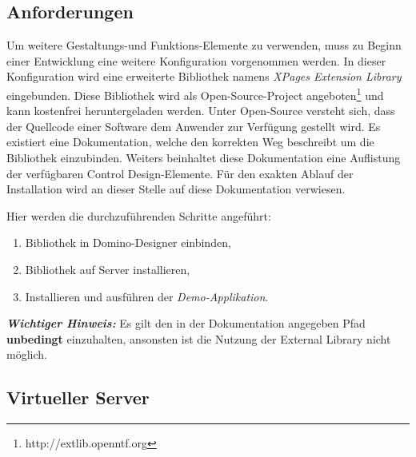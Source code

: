 \subsection{Anforderungen}
\label{sec:6template}
Um weitere Gestaltungs-und Funktions-Elemente zu verwenden, muss zu Beginn einer Entwicklung eine weitere Konfiguration vorgenommen werden.
In dieser Konfiguration wird eine erweiterte Bibliothek namens \textit{XPages Extension Library} eingebunden.
Diese Bibliothek wird als Open-Source-Project angeboten\footnote{http://extlib.openntf.org} und kann kostenfrei heruntergeladen werden.\newline
Unter Open-Source versteht sich, dass der Quellcode einer Software dem Anwender zur \linebreak Verfügung gestellt wird.
Es existiert eine Dokumentation, welche den korrekten Weg beschreibt um die Bibliothek einzubinden. Weiters beinhaltet diese Dokumentation 
eine Auflistung
der verfügbaren Control Design-Elemente. 
Für den exakten Ablauf der Installation wird an dieser Stelle auf diese Dokumentation verwiesen.
\vspace{0.5cm}

\vspace{0.3cm}


Hier werden die durchzuführenden Schritte angeführt:

\begin{enumerate}
\item Bibliothek in Domino-Designer einbinden,
\item Bibliothek auf Server installieren,
\item Installieren und ausführen der \textit{Demo-Applikation}.
\end{enumerate}

\vspace{0.5cm}

\begin{graybox}
\textbf{\textit{Wichtiger Hinweis:}} Es gilt den in der Dokumentation angegeben Pfad \textbf{unbedingt} einzuhalten, ansonsten ist die Nutzung der External
 Library nicht möglich.
\end{graybox}

\vspace{0.5cm}
\subsection{Virtueller Server}
\label{sec:6template}

